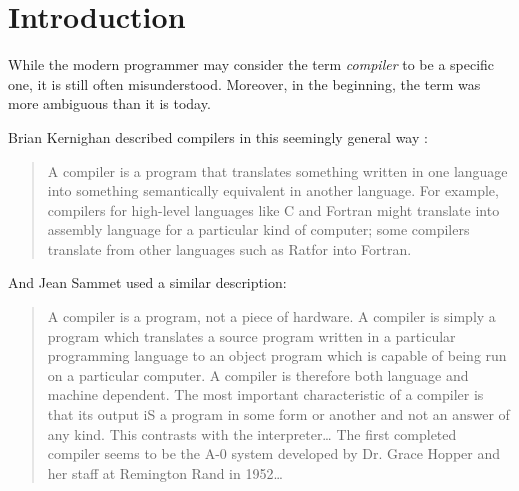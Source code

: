 \chapter{Introduction}
While the modern programmer may consider the term \emph{compiler} to be a specific one,
it is still often misunderstood. Moreover, in the beginning, the term was more ambiguous than it is today.


Brian Kernighan described compilers in this seemingly general way
\cite{new-history-of-modern-computing}:

\begin{quotation}
	A compiler is a program that translates something written in one language
	into something semantically equivalent in another language. For example,
	compilers for high-level languages like C and Fortran might translate into
	assembly language for a particular kind of computer; some compilers translate
	from other languages such as Ratfor into Fortran.
\end{quotation}

And Jean Sammet used a similar description:

\begin{quotation}
	A compiler is a program, not a piece of hardware. A compiler is simply
	a program which translates a source program written in a particular programming
	language to an object program which is capable of being run on
	a particular computer. A compiler is therefore both language and machine
	dependent. The most important characteristic of a compiler is that its output
	iS a program in some form or another and not an answer of any kind. This
	contrasts with the interpreter\dots
	The first completed
	compiler seems to be the A-0 system developed by Dr. Grace Hopper and
	her staff at Remington Rand in 1952\dots
	\cite{sammet_programming_languages_history_and_fundamentals_1969}
\end{quotation}

